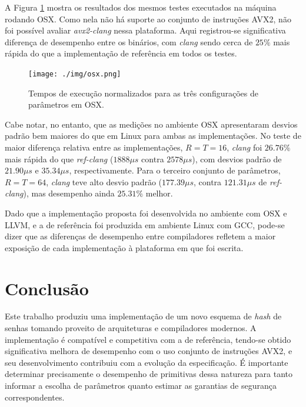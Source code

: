 \documentclass{article}
\begin{document}
A Figura \ref{results-osx} mostra os resultados dos mesmos testes
executados na máquina rodando OSX. Como nela não há suporte ao conjunto
de instruções AVX2, não foi possível avaliar \emph{avx2-clang} nessa
plataforma. Aqui registrou-se significativa diferença de desempenho entre os
binários, com \emph{clang} sendo cerca de $25\%$ mais rápida do que a
implementação de referência em todos os testes.

\begin{figure}[htbp]
\centering
\texttt{[image: ./img/osx.png]}
\caption{Tempos de execução normalizados para as três configurações de
parâmetros em OSX\label{results-osx}.}
\end{figure}

Cabe notar, no entanto, que as medições no ambiente OSX apresentaram desvios
padrão bem maiores do que em Linux para ambas as implementações. No teste de
maior diferença relativa entre as implementações, $R = T = 16$, \emph{clang} foi
$26.76\%$ mais rápida do que \emph{ref-clang} ($1888 \mu s$ contra $2578 \mu
s$), com desvios padrão de $21.90 \mu s$ e $35.34 \mu s$, respectivamente. Para
o terceiro conjunto de parâmetros, $R = T = 64$, \emph{clang} teve alto desvio
padrão ($177.39 \mu s$, contra $121.31 \mu s$ de \emph{ref-clang}), mas
desempenho ainda $25.31\%$ melhor.

Dado que a implementação proposta foi desenvolvida no ambiente com OSX e
LLVM, e a de referência foi produzida em ambiente Linux com GCC,
pode-se dizer que as diferenças de desempenho entre compiladores
refletem a maior exposição de cada implementação à plataforma em que foi
escrita.

\section{Conclusão}

Este trabalho produziu uma implementação de um novo esquema de
\emph{hash} de senhas tomando proveito de arquiteturas e compiladores
modernos. A implementação é compatível e competitiva com a de
referência, tendo-se obtido significativa melhora de desempenho com o
uso conjunto de instruções AVX2, e seu desenvolvimento contribuiu com a
evolução da especificação.
É importante determinar precisamente o desempenho de primitivas dessa natureza para tanto informar a escolha de parâmetros
quanto estimar as garantias de segurança correspondentes.



\end{document}
